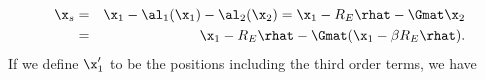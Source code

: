 \begin{eqnarray}
\x_s &=& \x_1 - \al_1(\x_1) - \al_2(\x_2) = \x_1 - R_E \rhat-  \Gmat \x_2 \nonumber\\
&=& \x_1 - R_E \rhat -  \Gmat (\x_1 - \beta R_E \rhat).
\label{eq:backgroundorder2}
\end{eqnarray}
If we define $\x_1'$ to be the positions including the third order terms, we have
  